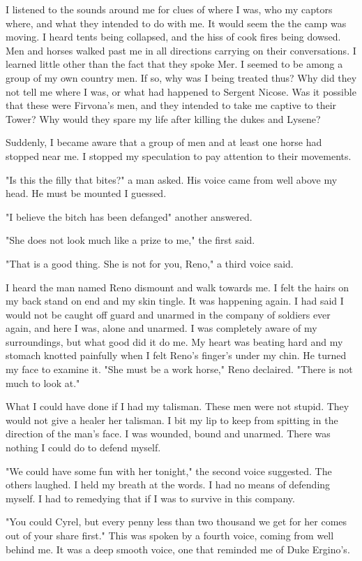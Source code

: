 \documentclass{article}
\begin{document}
I listened to the sounds around me for clues of where I was, who my captors where, and what they intended to do with me. It would seem the the camp was moving. I heard tents being collapsed, and the hiss of cook fires being dowsed. Men and horses walked past me in all directions carrying on their conversations. I learned little other than the fact that they spoke Mer. I seemed to be among a group of my own country men. If so, why was I being treated thus? Why did they not tell me where I was, or what had happened to Sergent Nicose. Was it possible that these were Firvona's men, and they intended to take me captive to their Tower? Why would they spare my life after killing the dukes and Lysene? 

Suddenly, I became aware that a group of men and at least one horse had stopped near me. I stopped my speculation to pay attention to their movements.

"Is this the filly that bites?" a man asked. His voice came from well above my head. He must be mounted I guessed. 

"I believe the bitch has been defanged" another answered. 

"She does not look much like a prize to me," the first said.

"That is a good thing. She is not for you, Reno," a third voice said.

I heard the man named Reno dismount and walk towards me. I felt the hairs on my back stand on end and my skin tingle. It was happening again. I had said I would not be caught off guard and unarmed in the company of soldiers ever again, and here I was, alone and unarmed. I was completely aware of my surroundings, but what good did it do me. My heart was beating hard and my stomach knotted painfully when I felt Reno's finger's under my chin. He turned my face to examine it. "She must be a work horse," Reno declaired. "There is not much to look at." 

What I could have done if I had my talisman. These men were not stupid. They would not give a healer her talisman. I bit my lip to keep from spitting in the direction of the man's face. I was wounded, bound and unarmed. There was nothing I could do to defend myself.

"We could have some fun with her tonight," the second voice suggested. The others laughed. I held my breath at the words. I had no means of defending myself. I had to remedying that if I was to survive in this company.

"You could Cyrel, but every penny less than two thousand we get for her comes out of your share first." This was spoken by a fourth voice, coming from well behind me. It was a deep smooth voice, one that reminded me of Duke Ergino's.
\end{document}

